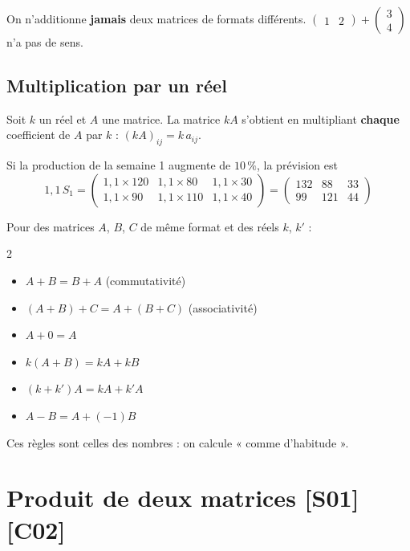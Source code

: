 \documentclass[a4paper,11pt]{article}
\newcommand{\M}[1]{\begin{pmatrix}#1\end{pmatrix}}
\begin{document}
\begin{attention}
On n'additionne \textbf{jamais} deux matrices de formats différents. $\M{1 & 2}+\M{3\\4}$ n'a pas de sens.
\end{attention}

\subsection{Multiplication par un réel}\label{subsec:reel}

\begin{definition}
Soit $k$ un réel et $A$ une matrice. La matrice $kA$ s'obtient en multipliant \textbf{chaque} coefficient de $A$ par $k$ : $(kA)_{ij} = k\,a_{ij}$.
\end{definition}

\begin{exemple}\label{ex:reel}
Si la production de la semaine 1 augmente de $10\,\%$, la prévision est
\[
1{,}1\,S_1 = \M{1{,}1\times 120 & 1{,}1\times 80 & 1{,}1\times 30\\ 1{,}1\times 90 & 1{,}1\times 110 & 1{,}1\times 40} = \M{132 & 88 & 33\\ 99 & 121 & 44}
\]
\end{exemple}

\begin{theoreme}
Pour des matrices $A$, $B$, $C$ de même format et des réels $k$, $k'$ :
\begin{multicols}{2}
\begin{itemize}
  \item $A+B = B+A$ (commutativité)
  \item $(A+B)+C = A+(B+C)$ (associativité)
  \item $A+0 = A$
  \item $k(A+B) = kA + kB$
  \item $(k+k')A = kA + k'A$
  \item $A-B = A+(-1)B$
\end{itemize}
\end{multicols}
Ces règles sont celles des nombres : on calcule « comme d'habitude ».
\end{theoreme}

\needspace{7cm}
\section{Produit de deux matrices \hfill {\normalsize\color{uimmred}[S01] [C02]}}\label{sec:produit}
\end{document}
